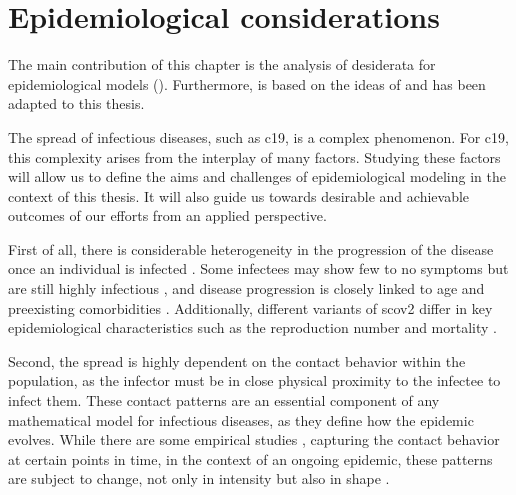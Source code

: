\glsresetall
\chapter{Epidemiological considerations}
\label{chap:epidemiological_considerations}
\newpage
\begin{tcolorbox}[title={Contributions of this chapter}]
    The main contribution of this chapter is the analysis of desiderata for epidemiological models (). 
    Furthermore,  is based on the ideas of \citep{Heyder2023Measures} and has been adapted to this thesis.
\end{tcolorbox}
\newpage

The spread of infectious diseases, such as \acrshort{c19}, is a complex phenomenon. For \acrshort{c19}, this complexity arises from the interplay of many factors. Studying these factors will allow us to define the aims and challenges of epidemiological modeling in the context of this thesis. It will also guide us towards desirable and achievable outcomes of our efforts from an applied perspective.

First of all, there is considerable heterogeneity in the progression of the disease once an individual is infected \citep{Salzberger2021Epidemiology}. Some infectees may show few to no symptoms but are still highly infectious \citep{Byambasuren2020Estimating}, and disease progression is closely linked to age and preexisting comorbidities \citep{Biswas2020Association}. Additionally, different variants of \acrshort{scov2} differ in key epidemiological characteristics such as the reproduction number \citep{Du2022Reproduction} and mortality \citep{Hughes2023Effect}. 

Second, the spread is highly dependent on the contact behavior within the population, as the infector must be in close physical proximity to the infectee to infect them. These contact patterns are an essential component of any mathematical model for infectious diseases, as they define how the epidemic evolves. While there are some empirical studies \citep{Tomori2021Individual,Mossong2008Social}, capturing the contact behavior at certain points in time, in the context of an ongoing epidemic, these patterns are subject to change, not only in intensity but also in shape \citep{Tomori2021Individual}. %

